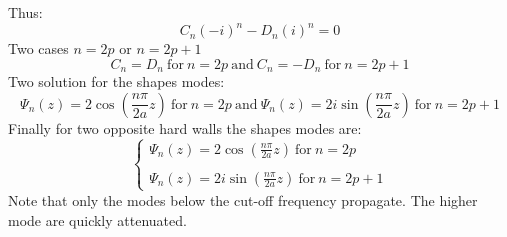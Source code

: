 Thus:
\begin{equation}
    C_n(-i)^{n}-D_n(i)^{n}=0
\end{equation}
Two cases $n=2p$ or $n=2p+1$
\begin{equation}
    C_n=D_n \ \text{for} \ n=2p \ \text{and} \ C_n=-D_n\ \text{for} \ n=2p+1 
\end{equation}
Two solution for the shapes modes:
\begin{equation}
    \Psi_{n}(z)=2\cos(\frac{n\pi}{2a}z) \ \text{for} \ n=2p \ \text{and} \ \Psi_{n}(z)=2i\sin(\frac{n\pi}{2a}z)\ \text{for} \ n=2p+1 
\end{equation}
Finally for two opposite hard walls the shapes modes are: 
\begin{equation}
    \left\{
    \begin{array}{ll}
    \Psi_{n}(z)=2\cos(\frac{n\pi}{2a}z)\ \text{for} \ n=2p \\
        \\
    \Psi_{n}(z)=2i\sin(\frac{n\pi}{2a}z) \ \text{for} \ n=2p+1
    \end{array}
    \right.
\end{equation}
Note that only the modes below the cut-off frequency propagate. The higher mode are quickly attenuated. 

